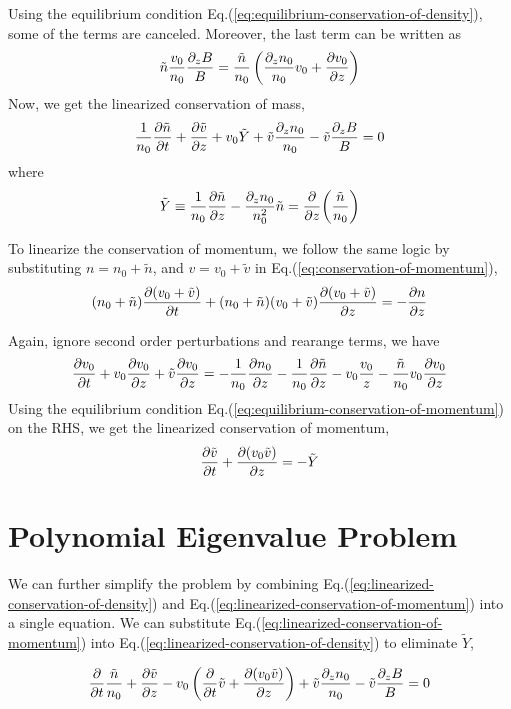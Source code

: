 Using the equilibrium condition Eq.(\ref{eq:equilibrium-conservation-of-density}), some of the terms are canceled. Moreover, the last term can be written as
\[ \tilde{n}\frac{v_0}{n_0}\frac{\partial_z B}{B} = \frac{\tilde{n}}{n_0}\left( \frac{\partial_z n_0}{n_0}v_0 + \pdv{v_0}{z} \right) \]
Now, we get the linearized conservation of mass,
\begin{equation} \label{eq:linearized-conservation-of-density}
	\frac{1}{n_0}\pdv{\tilde{n}}{t}
	+ \pdv{\tilde{v}}{z} + v_0\tilde{Y} + \tilde{v}\frac{\partial_z n_0}{n_0} - \tilde{v}\frac{\partial_z B}{B} = 0
\end{equation}
where
\[ \tilde{Y} \equiv \frac{1}{n_0}\pdv{\tilde{n}}{z} - \frac{\partial_z n_0}{n_0^2}\tilde{n} = \pdv{z}(\frac{\tilde{n}}{n_0}) \]

To linearize the conservation of momentum, we follow the same logic by substituting $n=n_0+\tilde{n}$, and $v=v_0+\tilde{v}$ in Eq.(\ref{eq:conservation-of-momentum}),
\[ (n_0+\tilde{n})\pdv{(v_0+\tilde{v})}{t} + (n_0+\tilde{n})(v_0+\tilde{v})\pdv{(v_0+\tilde{v})}{z} = -\pdv{n}{z} \]

Again, ignore second order perturbations and rearange terms, we have
\[ \pdv{v_0}{t} + v_0\pdv{v_0}{z} + \tilde{v}\pdv{v_0}{z}
	= -\frac{1}{n_0}\pdv{n_0}{z} -\frac{1}{n_0}\pdv{\tilde{n}}{z} -v_0\frac{v_0}{z} - \frac{\tilde{n}}{n_0}v_0\pdv{v_0}{z} \]
Using the equilibrium condition Eq.(\ref{eq:equilibrium-conservation-of-momentum}) on the RHS, we get the linearized conservation of momentum,
\begin{equation} \label{eq:linearized-conservation-of-momentum}
	\pdv{\tilde{v}}{t} + \pdv{(v_0\tilde{v})}{z} = -\tilde{Y}
\end{equation}

\section{Polynomial Eigenvalue Problem}
We can further simplify the problem by combining Eq.(\ref{eq:linearized-conservation-of-density}) and Eq.(\ref{eq:linearized-conservation-of-momentum}) into a single equation. We can substitute Eq.(\ref{eq:linearized-conservation-of-momentum}) into Eq.(\ref{eq:linearized-conservation-of-density}) to eliminate $\tilde{Y}$,

\begin{equation} \label{eq:single-governing-equation}
	\pdv{t}\frac{\tilde{n}}{n_0}
	+ \pdv{\tilde{v}}{z} - v_0\left(\pdv{t}\tilde{v}
	+ \pdv{(v_0\tilde{v})}{z}\right)
	+ \tilde{v}\frac{\partial_z n_0}{n_0}
	- \tilde{v}\frac{\partial_z B}{B}
	= 0
\end{equation}

